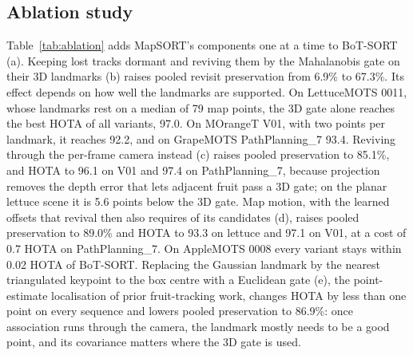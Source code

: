 \documentclass[pdflatex,sn-basic]{sn-jnl}%
\theoremstyle{thmstyleone}%
\begin{document}
\subsection{Ablation study}\label{sec:res-ablation}

Table~\ref{tab:ablation} adds MapSORT's components one at a time to BoT-SORT (a). Keeping lost tracks dormant and reviving them by the Mahalanobis gate on their 3D landmarks (b) raises pooled revisit preservation from 6.9\% to 67.3\%. Its effect depends on how well the landmarks are supported. On LettuceMOTS 0011, whose landmarks rest on a median of 79 map points, the 3D gate alone reaches the best HOTA of all variants, 97.0. On MOrangeT V01, with two points per landmark, it reaches 92.2, and on GrapeMOTS PathPlanning\_7 93.4. Reviving through the per-frame camera instead (c) raises pooled preservation to 85.1\%, and HOTA to 96.1 on V01 and 97.4 on PathPlanning\_7, because projection removes the depth error that lets adjacent fruit pass a 3D gate; on the planar lettuce scene it is 5.6 points below the 3D gate. Map motion, with the learned offsets that revival then also requires of its candidates (d), raises pooled preservation to 89.0\% and HOTA to 93.3 on lettuce and 97.1 on V01, at a cost of 0.7 HOTA on PathPlanning\_7. On AppleMOTS 0008 every variant stays within 0.02 HOTA of BoT-SORT. Replacing the Gaussian landmark by the nearest triangulated keypoint to the box centre with a Euclidean gate (e), the point-estimate localisation of prior fruit-tracking work, changes HOTA by less than one point on every sequence and lowers pooled preservation to 86.9\%: once association runs through the camera, the landmark mostly needs to be a good point, and its covariance matters where the 3D gate is used.
\end{document}
